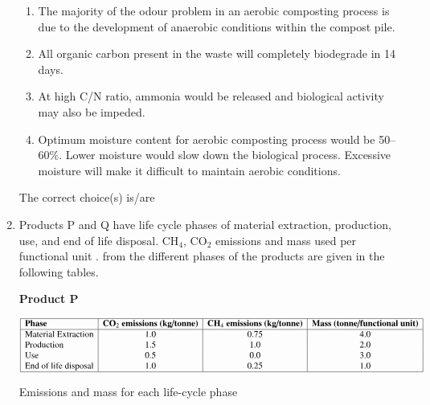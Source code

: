 \documentclass[journal,12pt,onecolumn]{IEEEtran}
\theoremstyle{remark}
\begin{document}
\begin{enumerate}
\begin{enumerate}[label=\Roman*.]
\item The majority of the odour problem in an aerobic composting process is due to the development of anaerobic conditions within the compost pile.
\item All organic carbon present in the waste will completely biodegrade in 14 days.
\item At high C/N ratio, ammonia would be released and biological activity may also be impeded.
\item Optimum moisture content for aerobic composting process would be 50--60\%. Lower moisture would slow down the biological process. Excessive moisture will make it difficult to maintain aerobic conditions.
\end{enumerate}

The correct choice(s) is/are

\begin{enumerate}
\end{enumerate}
\hfill{}

\newpage

\item Products P and Q have life cycle phases of material extraction, production, use, and end of life disposal. CH$_4$, CO$_2$ emissions and mass used per functional unit . from the different phases of the products are given in the following tables.

\textbf{Product P}

\begin{table}[h!]
\centering
\[
\begin{array}{|l|c|c|c|}
\hline
\textbf{Phase} & \textbf{CO$_2$ emissions (kg/tonne)} & \textbf{CH$_4$ emissions (kg/tonne)} & \textbf{Mass (tonne/functional unit)} \\
\hline
\text{Material Extraction} & 1.0 & 0.75 & 4.0 \\
\text{Production}          & 1.5 & 1.0  & 2.0 \\
\text{Use}                 & 0.5 & 0.0  & 3.0 \\
\text{End of life disposal}& 1.0 & 0.25 & 1.0 \\
\hline
\end{array}
\]
\caption{Emissions and mass for each life-cycle phase}
\label{tab:emissions}
\end{table}




\end{enumerate}
\end{document}
